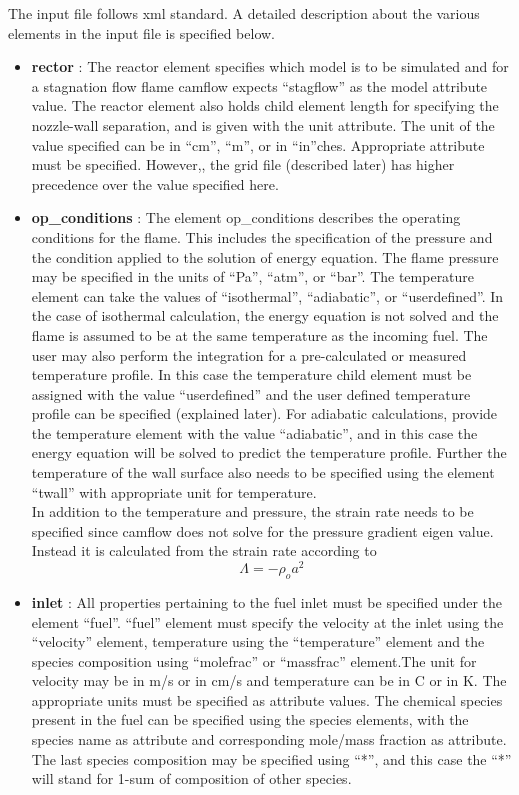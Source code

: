 The input file follows xml standard. A detailed description about the various elements in the input file is specified below.

\begin{itemize}
 \item \textbf{rector} : The reactor element specifies which model is to be simulated and for a stagnation flow flame camflow expects ``stagflow'' as the model attribute value. The reactor element also holds child element length for specifying the nozzle-wall separation, and is given with the unit attribute. The unit of the value specified can be in ``cm'', ``m'', or in ``in''ches. Appropriate attribute must be specified. However,, the grid file (described later) has higher precedence over the value specified here.

\item \textbf{op\_conditions} : The element op\_conditions describes the operating conditions for the flame. This includes the specification of the pressure and the condition applied to the solution of energy equation. The flame pressure may be specified in the units of ``Pa'', ``atm'', or ``bar''. The temperature element can take the values of ``isothermal'', ``adiabatic'', or ``userdefined''. In the case of isothermal calculation, the energy equation is not solved and the flame is assumed to be at the same temperature as the incoming fuel. The user may also perform the integration for a pre-calculated or measured temperature profile. In this case the temperature child element must be assigned with the value ``userdefined'' and the user defined temperature profile can be specified (explained later). For adiabatic calculations, provide the temperature element with the value ``adiabatic'', and in this case the energy equation will be solved to predict the temperature profile. Further the temperature of the wall surface also needs to be specified using the element ``twall'' with appropriate unit for temperature.\\

In addition to the temperature and pressure, the strain rate needs to be specified since camflow does not solve for the pressure gradient eigen value. Instead it is calculated from the strain rate according to
\begin{equation}
 \Lambda = -\rho_o a^2
\end{equation}

\item \textbf{inlet} : All properties pertaining to the fuel inlet must be specified under the element ``fuel''. ``fuel'' element must specify the velocity at the inlet using the ``velocity'' element, temperature using the ``temperature'' element and the species composition using ``molefrac'' or ``massfrac'' element.The unit for velocity may be in m/s or in cm/s and temperature can be in C or in K. The appropriate units must be specified as attribute values. The chemical species present in the fuel can be specified using the species elements, with the species name as attribute and corresponding mole/mass fraction as attribute. The last species composition may be specified using ``*'', and this case the ``*'' will stand for 1-sum of composition of other species. 


\end{itemize}
